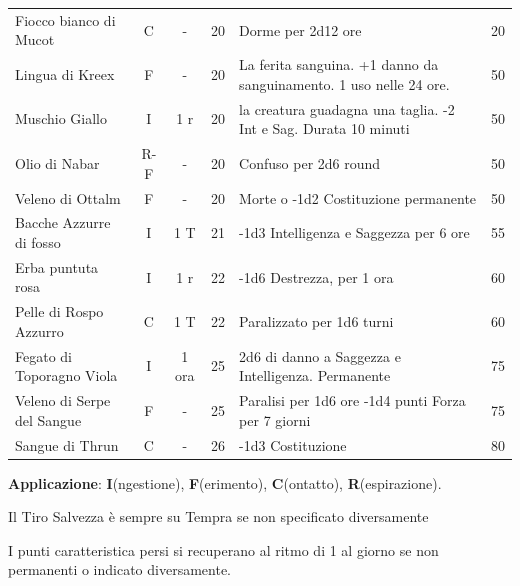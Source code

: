 \begin{tabularx}{\linewidth}{lcccXc}
	Fiocco bianco di Mucot \index{Fiocco bianco di Mucot}& C& - & 20& Dorme per 2d12 ore& 20\\

 \rowcolor{gray!20}Lingua di Kreex \index{Lingua di Kreex} & F& - & 20& La ferita sanguina. +1 danno da sanguinamento. 1 uso nelle 24 ore. & 50 \\

	Muschio Giallo \index{Muschio Giallo}& I& 1 r& 20& la creatura guadagna una taglia. -2 Int e Sag. Durata 10 minuti& 50\\

 \rowcolor{gray!20}Olio di Nabar \index{Olio di Nabar}& R-F& - & 20& Confuso per 2d6 round& 50\\

	Veleno di Ottalm\index{Veleno di Ottalm}& F& - & 20& Morte o -1d2 Costituzione permanente& 50\\

 \rowcolor{gray!20}Bacche Azzurre di fosso \index{Bacche Azzurre di fosso}& I& 1 T& 21& -1d3 Intelligenza e Saggezza per 6 ore& 55\\

	Erba puntuta rosa \index{Erba puntuta rosa}& I& 1 r& 22& -1d6 Destrezza, per 1 ora& 60\\

 \rowcolor{gray!20}Pelle di Rospo Azzurro \index{Pelle di Rospo Azzurro}& C& 1 T & 22& Paralizzato per 1d6 turni& 60\\

	Fegato di Toporagno Viola \index{Fegato di Toporagno Viola} & I& 1 ora& 25& 2d6 di danno a Saggezza e Intelligenza. Permanente & 75 \\

 \rowcolor{gray!20}Veleno di Serpe del Sangue \index{Veleno di Serpe del Sangue} & F& - & 25& Paralisi per 1d6 ore -1d4 punti Forza per 7 giorni & 75\\

	Sangue di Thrun \index{Sangue di Thrun} & C& - & 26& -1d3 Costituzione & 80\\

\end{tabularx}

\medskip

\textbf{Applicazione}: \textbf{I}(ngestione), \textbf{F}(erimento), \textbf{C}(ontatto), \textbf{R}(espirazione).

Il Tiro Salvezza è sempre su Tempra se non specificato diversamente

I punti caratteristica persi si recuperano al ritmo di 1 al giorno se non permanenti o indicato diversamente.

